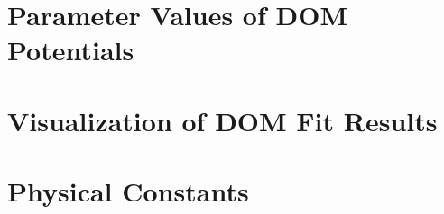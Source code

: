 \documentclass[12pt,twoside]{book} %
\newcommand{\textDirectory}{text}
\begin{document}
\begin{appendices}
    \chapter{Parameter Values of DOM Potentials}
    

    \chapter{Visualization of DOM Fit Results}

    \chapter*{Physical Constants}
    

\end{appendices}

\fancyhead{} %
\fancyhead[LE]{\MakeUppercase{ \leftmark}} %

\printglossary
\end{document}

